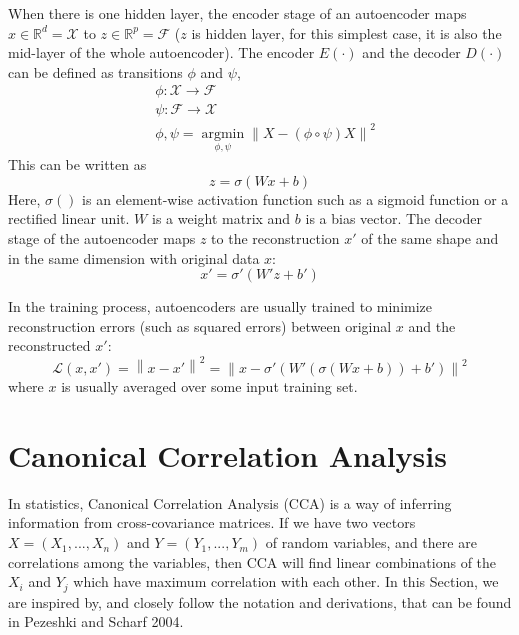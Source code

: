 \documentclass[12pt]{report} %
\newcommand{\norm}[1]{\left\lVert #1 \right\rVert}
\begin{document}
When there is one hidden layer, the encoder stage of an autoencoder maps \(x\in \mathbb{R}^{d}=\mathcal{X}\) to \(z\in \mathbb{R}^{p}=\mathcal{F}\) ($z$ is hidden layer, for this simplest case, it is also the mid-layer of the whole autoencoder). The encoder \(E(\cdot)\) and the decoder \(D(\cdot)\) can be defined as transitions $\phi$ and $\psi$,
\begin{equation}
\begin{split}
& \phi:\mathcal{X}\to\mathcal{F} \\
& \psi:\mathcal{F}\to\mathcal{X} \\
& \phi,\psi=\operatorname*{argmin}_{\phi,\psi} \norm{X-(\phi \circ \psi)X}^2
\end{split}
\end{equation}
This can be written as
\begin{equation}
z=\sigma(Wx+b)
\end{equation}
Here, $\sigma()$ is an element-wise activation function such as a sigmoid function or a rectified linear unit. $W$ is a weight matrix and $b$ is a bias vector. The decoder stage of the autoencoder maps $z$ to the reconstruction $x'$  of the same shape and in the same dimension with original data $x$:
\begin{equation}
x'=\sigma'(W'z+b')
\end{equation}

In the training process, autoencoders are usually trained to minimize reconstruction errors (such as squared errors) between original $x$ and the reconstructed $x'$:
\begin{equation}
\mathcal{L}(x,x')=\norm{x-x'}^2=\norm{x-\sigma'(W'(\sigma(Wx+b))+b')}^2
\end{equation}
where $x$ is usually averaged over some input training set\cite{AE}.

\section{Canonical Correlation Analysis}
In statistics, Canonical Correlation Analysis (CCA) is a way of inferring information from cross-covariance matrices. If we have two vectors \(X = (X_{1}, ..., X_{n})\) and \(Y = (Y_{1}, ..., Y_{m})\) of random variables, and there are correlations among the variables, then CCA will find linear combinations of the $X_{i}$ and $Y_{j}$ which have maximum correlation with each other\cite{CCA}. In this Section, we are inspired by, and closely follow the notation and derivations, that can be found in Pezeshki and Scharf 2004\cite{ECCA}.
\end{document}
